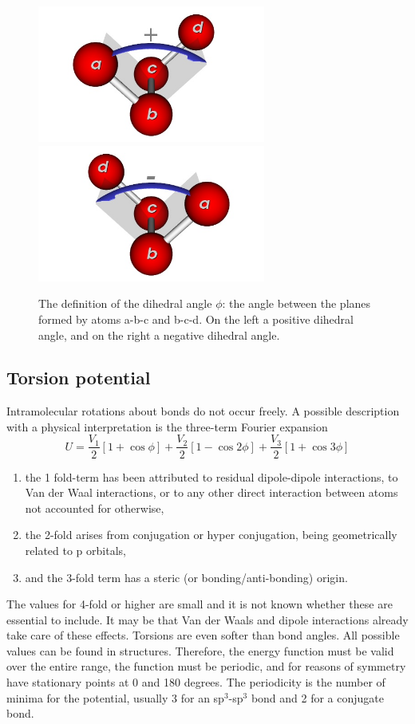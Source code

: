 \begin{figure}[t]
  \centering
  \includegraphics[width=7.5cm]{./Potentials/TorsionAnglePlus.jpg}
  \includegraphics[width=7.5cm]{./Potentials/TorsionAngleMinus.jpg}
  \caption{The definition of the dihedral angle $\phi$: the angle between the planes formed by atoms a-b-c and b-c-d.
   On the left a positive dihedral angle, and on the right a negative dihedral angle.}
  \label{Fig: Torsion definition}
\end{figure}

\subsection{Torsion potential}

Intramolecular rotations about bonds do not occur freely. A possible description with a physical interpretation
is the three-term Fourier expansion
\begin{equation}
U=\frac{V_1}{2}\left[1+\cos\phi\right]+
  \frac{V_2}{2}\left[1-\cos2\phi\right]+
  \frac{V_3}{2}\left[1+\cos3\phi\right]
\end{equation}
\begin{enumerate}
\item{the 1 fold-term has been attributed to residual dipole-dipole interactions, to Van der Waal interactions,
or to any other direct interaction between atoms not accounted for otherwise,}
\item{the 2-fold arises from conjugation or hyper conjugation, being geometrically related to p orbitals,}
\item{and the 3-fold term has a steric (or bonding/anti-bonding) origin.}
\end{enumerate}
The values for 4-fold or higher are small and it is not known whether these are essential to include.
It may be that Van der Waals and dipole interactions already take care of these effects.
Torsions are even softer than bond angles. All possible values can be found in structures. Therefore, the
energy function must be valid over the entire range, the function must be periodic, and for reasons of
symmetry have stationary points at 0 and 180 degrees. The periodicity is the number of minima for the
potential, usually 3 for an sp$^3$-sp$^3$ bond and 2 for a conjugate bond.


